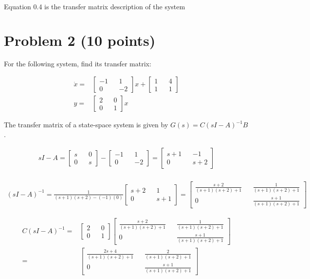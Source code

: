 \documentclass[paper=a4,margin, fontsize=11pt]{scrartcl} %
\numberwithin{equation}{section} %
\numberwithin{figure}{section} %
\numberwithin{table}{section} %
\begin{document}
Equation 0.4 is the transfer matrix description of the system

\section*{Problem 2 (10 points)}
For the following system, find its transfer matrix:

\begin{align*}
\dot{x}=&\begin{bmatrix} -1 && 1 \\ 0 && -2\end{bmatrix}x
+\begin{bmatrix}1 && 4\\1 && 1\end{bmatrix}\\
y=&\begin{bmatrix}2 && 0\\0 && 1\end{bmatrix}x
\end{align*}

The transfer matrix of a state-space system is given by $G(s)=C(sI-A)^{-1}B$.

\begin{align*}
sI-A=\begin{bmatrix}s && 0 \\0 && s\end{bmatrix} -
\begin{bmatrix} -1 && 1\\ 0 && -2\end{bmatrix}=\begin{bmatrix} s+1 && -1 \\0 && s+2\end{bmatrix}\\
\end{align*}

\begin{align*}
(sI-A)^{-1} = \frac{1}{(s+1)(s+2)-(-1)(0)}\begin{bmatrix}s+2 && 1\\0 && s+1\end{bmatrix}=\begin{bmatrix}
\frac{s+2}{(s+1)(s+2)+1} && \frac{1}{(s+1)(s+2)+1} \\ 0 && \frac{s+1}{(s+1)(s+2)+1}\end{bmatrix}
\end{align*}

\begin{align*}
C(sI-A)^{-1}=&\begin{bmatrix}2 && 0 \\ 0 && 1\end{bmatrix}\begin{bmatrix}\frac{s+2}{(s+1)(s+2)+1} && \frac{1}{(s+1)(s+2)+1} \\ 0 &&\frac{s+1}{(s+1)(s+2)+1}\end{bmatrix}\\
=&\begin{bmatrix}\frac{2s+4}{(s+1)(s+2)+1} && \frac{2}{(s+1)(s+2)+1} \\ 0 && \frac{s+1}{(s+1)(s+2)+1}\end{bmatrix}
\end{align*}
\end{document}
